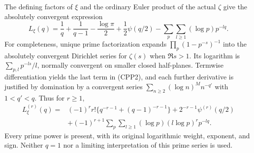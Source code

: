 The defining factors of $\xi$ and the ordinary Euler product of
the actual $\zeta$ give the absolutely convergent expression
\begin{equation}\tag{CPP2}
 L_\xi(q)=\frac1q+\frac1{q-1}-\frac{\log\pi}{2}
             +\frac12\psi(q/2)
             -\sum_p\sum_{l\ge1}(\log p)p^{-lq}.
\end{equation}
For completeness, unique prime factorization expands
$\prod_p(1-p^{-s})^{-1}$ into the absolutely convergent Dirichlet
series for $\zeta(s)$ when $\Re s>1$. Its logarithm is
$\sum_{p,l}p^{-ls}/l$, normally convergent on smaller closed
half-planes. Termwise differentiation yields the last term in
(CPP2), and each further derivative is justified by domination
by a convergent series $\sum_{n\ge2}(\log n)^M n^{-q'}$ with
$1<q'<q$. Thus for $r\ge1$,
\begin{equation}\tag{CPP3}
\begin{split}
 L_\xi^{(r)}(q)
  ={}&(-1)^r r!\{q^{-r-1}+(q-1)^{-r-1}\}
       +2^{-r-1}\psi^{(r)}(q/2)\\
    &+(-1)^{r+1}\sum_p\sum_{l\ge1}
                    (\log p)(l\log p)^r p^{-lq}.
\end{split}
\end{equation}
Every prime power is present, with its original logarithmic
weight, exponent, and sign. Neither $q=1$ nor a limiting
interpretation of this prime series is used.

